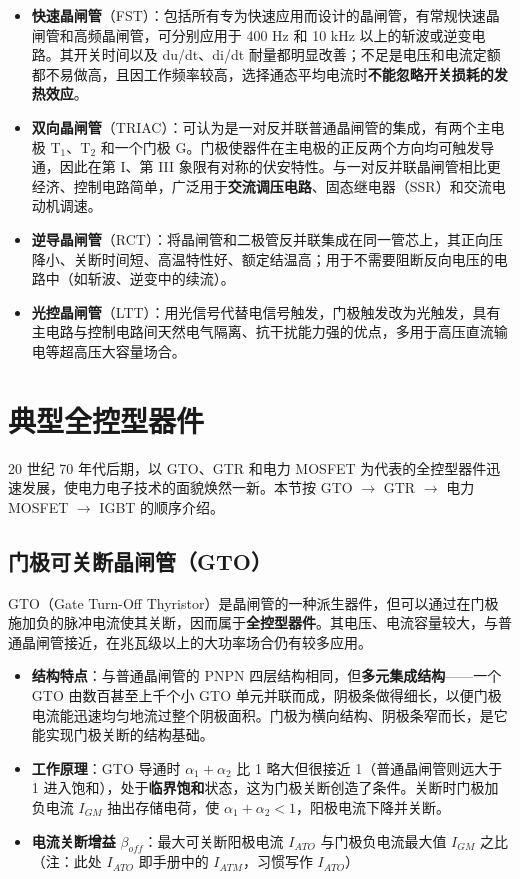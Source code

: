 \begin{itemize}
  \item \textbf{快速晶闸管}（FST）：包括所有专为快速应用而设计的晶闸管，有常规快速晶闸管和高频晶闸管，可分别应用于 400 Hz 和 10 kHz 以上的斩波或逆变电路。其开关时间以及 du/dt、di/dt 耐量都明显改善；不足是电压和电流定额都不易做高，且因工作频率较高，选择通态平均电流时\textbf{不能忽略开关损耗的发热效应}。
  \item \textbf{双向晶闸管}（TRIAC）：可认为是一对反并联普通晶闸管的集成，有两个主电极 T$_1$、T$_2$ 和一个门极 G。门极使器件在主电极的正反两个方向均可触发导通，因此在第 I、第 III 象限有对称的伏安特性。与一对反并联晶闸管相比更经济、控制电路简单，广泛用于\textbf{交流调压电路}、固态继电器（SSR）和交流电动机调速。
  \item \textbf{逆导晶闸管}（RCT）：将晶闸管和二极管反并联集成在同一管芯上，其正向压降小、关断时间短、高温特性好、额定结温高；用于不需要阻断反向电压的电路中（如斩波、逆变中的续流）。
  \item \textbf{光控晶闸管}（LTT）：用光信号代替电信号触发，门极触发改为光触发，具有主电路与控制电路间天然电气隔离、抗干扰能力强的优点，多用于高压直流输电等超高压大容量场合。
\end{itemize}

\section{典型全控型器件}

20 世纪 70 年代后期，以 GTO、GTR 和电力 MOSFET 为代表的全控型器件迅速发展，使电力电子技术的面貌焕然一新。本节按 GTO $\rightarrow$ GTR $\rightarrow$ 电力 MOSFET $\rightarrow$ IGBT 的顺序介绍。

\subsection{门极可关断晶闸管（GTO）}

GTO（Gate Turn-Off Thyristor）是晶闸管的一种派生器件，但可以通过在门极施加负的脉冲电流使其关断，因而属于\textbf{全控型器件}。其电压、电流容量较大，与普通晶闸管接近，在兆瓦级以上的大功率场合仍有较多应用。

\begin{itemize}
  \item \textbf{结构特点}：与普通晶闸管的 PNPN 四层结构相同，但\textbf{多元集成结构}——一个 GTO 由数百甚至上千个小 GTO 单元并联而成，阴极条做得细长，以便门极电流能迅速均匀地流过整个阴极面积。门极为横向结构、阴极条窄而长，是它能实现门极关断的结构基础。
  \item \textbf{工作原理}：GTO 导通时 $\alpha_1+\alpha_2$ 比 1 略大但很接近 1（普通晶闸管则远大于 1 进入饱和），处于\textbf{临界饱和}状态，这为门极关断创造了条件。关断时门极加负电流 $I_{GM}$ 抽出存储电荷，使 $\alpha_1+\alpha_2<1$，阳极电流下降并关断。
  \item \textbf{电流关断增益} $\beta_{off}$：最大可关断阳极电流 $I_{ATO}$ 与门极负电流最大值 $I_{GM}$ 之比（注：此处 $I_{ATO}$ 即手册中的 $I_{ATM}$，习惯写作 $I_{ATO}$）
\end{itemize}

